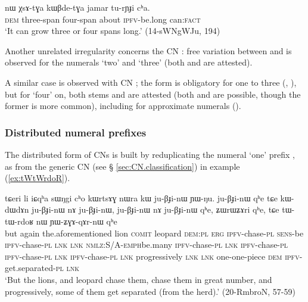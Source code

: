 \begin{exe}
\ex \label{ex:XsAtGa}
\gll nɯ χsɤ-tɣa kɯβde-tɣa jamar tu-rɲɟi cʰa. \\
\textsc{dem} three-span four-span about \textsc{ipfv}-be.long can:\textsc{fact} \\
\glt `It can grow three or four spans long.' (14-sWNgWJu, 194)
\end{exe}

Another unrelated irregularity concerns the CN : free variation between  and  is observed for the numerals `two' and `three' (both  and  are attested).

A similar case is observed with CN ; the form  is obligatory for one to three (, ), but for `four' on, both stems  and  are attested (both  and  are possible, though the former is more common), including for approximate numerals ().  

\subsubsection{Distributed numeral prefixes} \label{sec:numeral.prefixes.distributed}
The distributed form of CNs is built by reduplicating the numeral `one' prefix , as  from the generic CN  (see § \ref{sec:CN.classification}) in example (\ref{ex:tWtWrdoR}).

 \begin{exe}
\ex  \label{ex:tWtWrdoR}
 \gll 
tɕeri li iɕqʰa sɯŋgi cʰo kɯrtsɤɣ nɯra kɯ ju-βɟi-nɯ ɲɯ-ŋu. ju-βɟi-nɯ qʰe tɕe kɯ-dɯ\redp{}dɤn ju-βɟi-nɯ nɤ ju-βɟi-nɯ, ju-βɟi-nɯ nɤ ju-βɟi-nɯ qʰe, ʑɯrɯʑɤri qʰe, tɕe tɯ-tɯ-rdoʁ nɯ ɲɯ-ʑɣɤ-qɤr-nɯ qʰe \\
but again the.aforementioned  lion \textsc{comit} leopard \textsc{dem}:\textsc{pl} \textsc{erg} \textsc{ipfv}-chase-\textsc{pl} \textsc{sens}-be \textsc{ipfv}-chase-\textsc{pl} \textsc{lnk} \textsc{lnk} \textsc{nmlz}:S/A-\textsc{emph}\redp{}be.many \textsc{ipfv}-chase-\textsc{pl} \textsc{lnk} \textsc{ipfv}-chase-\textsc{pl}  \textsc{ipfv}-chase-\textsc{pl} \textsc{lnk} \textsc{ipfv}-chase-\textsc{pl} \textsc{lnk} progressively \textsc{lnk} \textsc{lnk} one-one-piece \textsc{dem} \textsc{ipfv}-get.separated-\textsc{pl} \textsc{lnk} \\
\glt `But the lions, and leopard chase them, chase them in great number, and progressively, some of them get separated (from the herd).' (20-RmbroN, 57-59)
   \end{exe}

